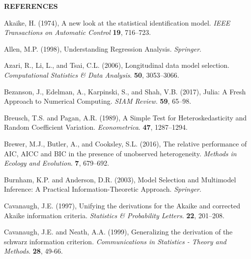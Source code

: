 
\begin{center}
\textbf{REFERENCES}
\end{center}
\singlespace

\phantom{a}

\rff Akaike, H. (1974),
      A new look at the statistical identification model.
     {\it IEEE Transactions on Automatic Control}
     {\bf 19}, {716--723}.

\phantom{a}

\rff Allen, M.P. (1998),
      Understanding Regression Analysis.
      {\it Springer}.

\phantom{a}

\rff Azari, R., Li, L., and Tsai, C.L. (2006),
      Longitudinal data model selection.
      {\it Computational Statistics \& Data Analysis}.
      {\bf 50}, {3053--3066}.

\phantom{a}

\rff Bezanson, J., Edelman, A., Karpinski, S., and Shah, V.B. (2017),
      Julia: A Fresh Approach to Numerical Computing.
      {\it SIAM Review}.
      {\bf 59}, {65--98}.

\phantom{a}

\rff Breusch, T.S. and Pagan, A.R. (1989),
      A Simple Test for Heteroskedasticity and Random Coefficient Variation.
      {\it Econometrica}.
      {\bf 47}, {1287--1294}.

\phantom{a}

\rff Brewer, M.J., Butler, A., and Cooksley, S.L. (2016),
      The relative performance of AIC, AICC and BIC in the presence of unobserved heterogeneity.
      {\it Methods in Ecology and Evolution}.
      {\bf 7}, {679--692}.

\phantom{a}

\rff Burnham, K.P. and Anderson, D.R. (2003),
      Model Selection and Multimodel Inference: A Practical Information-Theoretic Approach.
      {\it Springer}.

\phantom{a}

\rff Cavanaugh, J.E. (1997),
      Unifying the derivations for the Akaike and corrected Akaike information criteria.
      {\it Statistics \& Probability Letters}.
      {\bf 22}, {201--208}.

\phantom{a}

\rff Cavanaugh, J.E. and Neath, A.A. (1999),
      Generalizing the derivation of the schwarz information criterion.
      {\it Communications in Statistics - Theory and Methods}.
      {\bf 28}, {49-66}.

